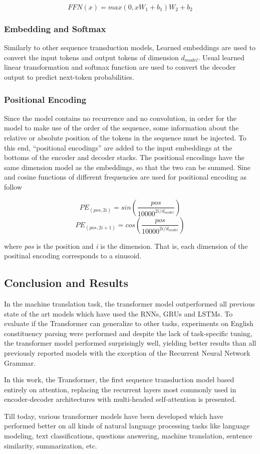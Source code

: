 \begin{equation}
    FFN(x) = max(0, xW_1 + b_1)W_2 + b_2
\end{equation}

\subsubsection{Embedding and Softmax}
Similarly to other sequence transduction models, Learned embeddings are used to convert the input tokens and output tokens of dimension $d_{model}$. Usual learned linear transformation and softmax function are used to convert the decoder output to predict next-token probabilities. 

\subsubsection{Positional Encoding}
Since the model contains no recurrence and no convolution, in order for the model to make use of the order of the sequence, some information about the relative or absolute position of the tokens in the sequence must be injected. To this end, “positional encodings” are added to the input embeddings at the bottoms of the encoder and decoder stacks. The positional encodings have the same dimension model as the embeddings, so that the two can be summed. Sine and cosine functions of different frequencies are used for positional encoding as follow

\begin{equation}
    PE_{(pos, 2i)} = sin(\frac{pos}{10000^{2i/d_{model}}})
\end{equation}
\begin{equation}
    PE_{(pos, 2i + 1)} = cos(\frac{pos}{10000^{2i/d_{model}}})
\end{equation}

where \textit{pos} is the position and \textit{i} is the dimension. That is, each dimension of the positinal encoding corresponds to a sinusoid.

\subsection{Conclusion and Results}
In the machine translation task, the transformer model outperformed all previous state of the art models which have used the RNNs, GRUs and LSTMs. To evaluate if the Transformer can generalize to other tasks, experiments on English constituency parsing  were performed and despite the lack of task-specific tuning, the transformer model performed surprisingly well, yielding better results than all previously reported models with the exception of the Recurrent Neural Network Grammar.

In this work, the Transformer, the first sequence transduction model based entirely on attention, replacing the recurrent layers most commonly used in encoder-decoder architectures with multi-headed self-attention is presented.

Till today, various transformer models have been developed which have performed better on all kinds of natural language processing tasks like language modeling, text classifications, questions answering, machine translation, sentence similarity, summarization, etc.
